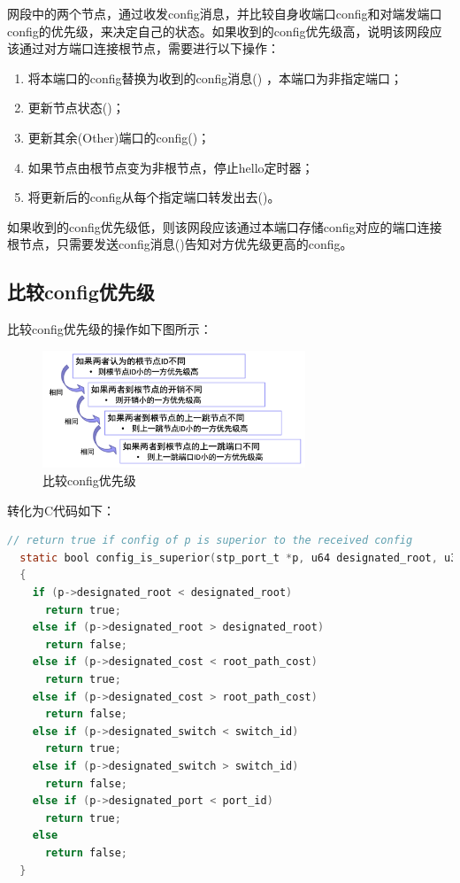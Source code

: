 \documentclass[UTF8]{report}
\begin{document}
网段中的两个节点，通过收发config消息，并比较自身收端口config和对端发端口config的优先级，来决定自己的状态。如果收到的config优先级高，说明该网段应该通过对方端口连接根节点，需要进行以下操作：

\begin{enumerate}
  \item 将本端口的config替换为收到的config消息() ，本端口为非指定端口；
  \item 更新节点状态()；
  \item 更新其余(Other)端口的config()；
  \item 如果节点由根节点变为非根节点，停止hello定时器；
  \item 将更新后的config从每个指定端口转发出去()。
\end{enumerate}

如果收到的config优先级低，则该网段应该通过本端口存储config对应的端口连接根节点，只需要发送config消息()告知对方优先级更高的config。

\subsection{比较config优先级}

比较config优先级的操作如下图所示：

\begin{figure}[H]
  \centering
  \includegraphics[width=0.7\textwidth]{compare.png}
  \caption{比较config优先级}
\end{figure}

转化为C代码如下：

\begin{lstlisting}[language=C]
  // return true if config of p is superior to the received config
  static bool config_is_superior(stp_port_t *p, u64 designated_root, u32 root_path_cost, u64 switch_id, u16 port_id)
  {
    if (p->designated_root < designated_root)
      return true;
    else if (p->designated_root > designated_root)
      return false;
    else if (p->designated_cost < root_path_cost)
      return true;
    else if (p->designated_cost > root_path_cost)
      return false;
    else if (p->designated_switch < switch_id)
      return true;
    else if (p->designated_switch > switch_id)
      return false;
    else if (p->designated_port < port_id)
      return true;
    else
      return false;
  }
\end{lstlisting}
\end{document}
